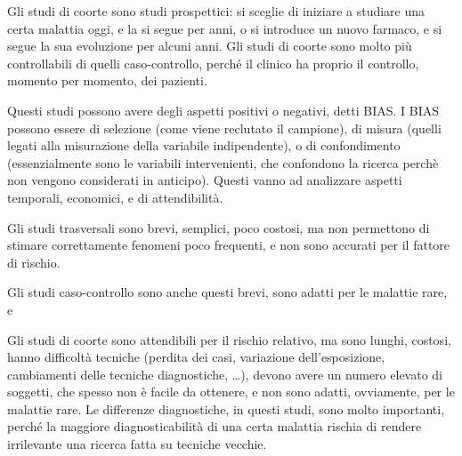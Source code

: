 Gli studi di coorte sono studi prospettici: si sceglie di iniziare a studiare una certa malattia oggi, e la si segue per anni, o si introduce un nuovo farmaco, e si segue la sua evoluzione per alcuni anni. Gli studi di coorte sono molto più controllabili di quelli caso-controllo, perché il clinico ha proprio il controllo, momento per momento, dei pazienti.

Questi studi possono avere degli aspetti positivi o negativi, detti BIAS. I BIAS possono essere di selezione (come viene reclutato il campione), di misura (quelli legati alla misurazione della variabile indipendente), o di confondimento (essenzialmente sono le variabili intervenienti, che confondono la ricerca perchè non vengono considerati in anticipo). Questi vanno ad analizzare aspetti temporali, economici, e di attendibilità.

Gli studi trasversali sono brevi, semplici, poco costosi, ma non permettono di stimare correttamente fenomeni poco frequenti, e non sono accurati per il fattore di rischio.

Gli studi caso-controllo sono anche questi brevi, sono adatti per le malattie rare, e %

Gli studi di coorte sono attendibili per il rischio relativo, ma sono lunghi, costosi, hanno difficoltà tecniche (perdita dei casi, variazione dell'esposizione, cambiamenti delle tecniche diagnostiche, \dots), devono avere un numero elevato di soggetti, che spesso non è facile da ottenere, e non sono adatti, ovviamente, per le malattie rare. Le differenze diagnostiche, in questi studi, sono molto importanti, perché la maggiore diagnosticabilità di una certa malattia rischia di rendere irrilevante una ricerca fatta su tecniche vecchie.

